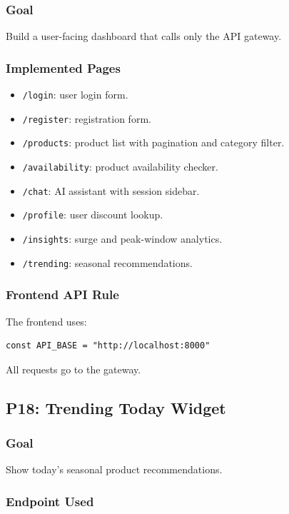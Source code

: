 \documentclass[11pt,a4paper]{article}
\begin{document}
\subsubsection*{Goal}
Build a user-facing dashboard that calls only the API gateway.

\subsubsection*{Implemented Pages}

\begin{itemize}
  \item \texttt{/login}: user login form.
  \item \texttt{/register}: registration form.
  \item \texttt{/products}: product list with pagination and category filter.
  \item \texttt{/availability}: product availability checker.
  \item \texttt{/chat}: AI assistant with session sidebar.
  \item \texttt{/profile}: user discount lookup.
  \item \texttt{/insights}: surge and peak-window analytics.
  \item \texttt{/trending}: seasonal recommendations.
\end{itemize}

\subsubsection*{Frontend API Rule}

The frontend uses:

\begin{lstlisting}
const API_BASE = "http://localhost:8000"
\end{lstlisting}

All requests go to the gateway.

\subsection{P18: Trending Today Widget}

\subsubsection*{Goal}
Show today's seasonal product recommendations.

\subsubsection*{Endpoint Used}
\end{document}
